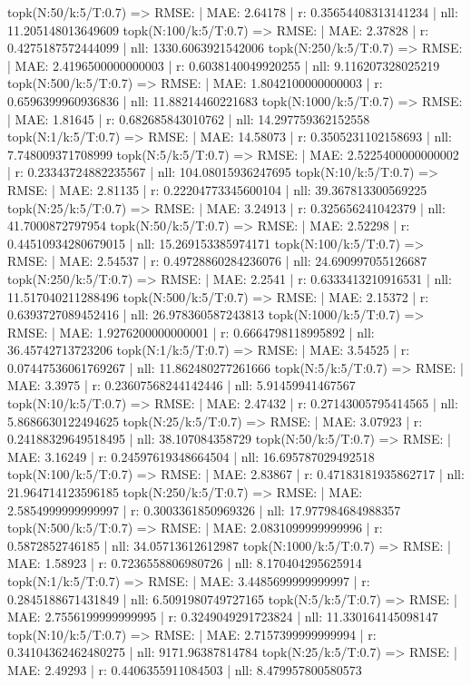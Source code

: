 topk(N:50/k:5/T:0.7) => RMSE: | MAE: 2.64178 | r: 0.35654408313141234 | nll: 11.205148013649609
topk(N:100/k:5/T:0.7) => RMSE: | MAE: 2.37828 | r: 0.4275187572444099 | nll: 1330.6063921542006
topk(N:250/k:5/T:0.7) => RMSE: | MAE: 2.4196500000000003 | r: 0.6038140049920255 | nll: 9.116207328025219
topk(N:500/k:5/T:0.7) => RMSE: | MAE: 1.8042100000000003 | r: 0.6596399960936836 | nll: 11.88214460221683
topk(N:1000/k:5/T:0.7) => RMSE: | MAE: 1.81645 | r: 0.682685843010762 | nll: 14.297759362152558
topk(N:1/k:5/T:0.7) => RMSE: | MAE: 14.58073 | r: 0.3505231102158693 | nll: 7.748009371708999
topk(N:5/k:5/T:0.7) => RMSE: | MAE: 2.5225400000000002 | r: 0.23343724882235567 | nll: 104.08015936247695
topk(N:10/k:5/T:0.7) => RMSE: | MAE: 2.81135 | r: 0.22204773345600104 | nll: 39.367813300569225
topk(N:25/k:5/T:0.7) => RMSE: | MAE: 3.24913 | r: 0.325656241042379 | nll: 41.7000872797954
topk(N:50/k:5/T:0.7) => RMSE: | MAE: 2.52298 | r: 0.44510934280679015 | nll: 15.269153385974171
topk(N:100/k:5/T:0.7) => RMSE: | MAE: 2.54537 | r: 0.49728860284236076 | nll: 24.690997055126687
topk(N:250/k:5/T:0.7) => RMSE: | MAE: 2.2541 | r: 0.6333413210916531 | nll: 11.517040211288496
topk(N:500/k:5/T:0.7) => RMSE: | MAE: 2.15372 | r: 0.6393727089452416 | nll: 26.978360587243813
topk(N:1000/k:5/T:0.7) => RMSE: | MAE: 1.9276200000000001 | r: 0.6664798118995892 | nll: 36.45742713723206
topk(N:1/k:5/T:0.7) => RMSE: | MAE: 3.54525 | r: 0.07447536061769267 | nll: 11.862480277261666
topk(N:5/k:5/T:0.7) => RMSE: | MAE: 3.3975 | r: 0.23607568244142446 | nll: 5.91459941467567
topk(N:10/k:5/T:0.7) => RMSE: | MAE: 2.47432 | r: 0.27143005795414565 | nll: 5.8686630122494625
topk(N:25/k:5/T:0.7) => RMSE: | MAE: 3.07923 | r: 0.24188329649518495 | nll: 38.107084358729
topk(N:50/k:5/T:0.7) => RMSE: | MAE: 3.16249 | r: 0.24597619348664504 | nll: 16.695787029492518
topk(N:100/k:5/T:0.7) => RMSE: | MAE: 2.83867 | r: 0.47183181935862717 | nll: 21.964714123596185
topk(N:250/k:5/T:0.7) => RMSE: | MAE: 2.5854999999999997 | r: 0.3003361850969326 | nll: 17.977984684988357
topk(N:500/k:5/T:0.7) => RMSE: | MAE: 2.0831099999999996 | r: 0.5872852746185 | nll: 34.05713612612987
topk(N:1000/k:5/T:0.7) => RMSE: | MAE: 1.58923 | r: 0.7236558806980726 | nll: 8.170404295625914
topk(N:1/k:5/T:0.7) => RMSE: | MAE: 3.4485699999999997 | r: 0.2845188671431849 | nll: 6.5091980749727165
topk(N:5/k:5/T:0.7) => RMSE: | MAE: 2.7556199999999995 | r: 0.3249049291723824 | nll: 11.330164145098147
topk(N:10/k:5/T:0.7) => RMSE: | MAE: 2.7157399999999994 | r: 0.34104362462480275 | nll: 9171.96387814784
topk(N:25/k:5/T:0.7) => RMSE: | MAE: 2.49293 | r: 0.4406355911084503 | nll: 8.479957800580573
